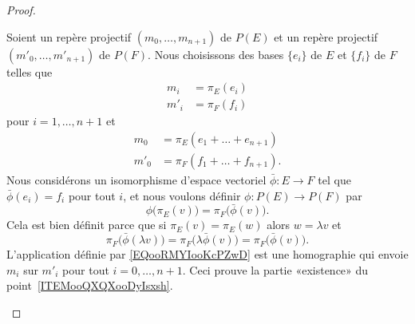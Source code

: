 \begin{proof}
\begin{subproof}
            Soient un repère projectif \( (m_0,\ldots, m_{n+1})\) de \( P(E)\) et un repère projectif \( (m'_0,\ldots, m'_{n+1})\) de \( P(F)\). Nous choisissons des bases \( \{ e_i \}\) de \( E\) et \(  \{ f_i \}\) de \( F\) telles que
            \begin{subequations}
                \begin{align}
                    m_i&=\pi_E(e_i)\\
                    m'_i&=\pi_F(f_i)
                \end{align}
            \end{subequations}
            pour \( i=1,\ldots, n+1\) et
            \begin{subequations}
                \begin{align}
                    m_0&=\pi_E(e_1+\ldots +e_{n+1})\\
                    m'_0&=\pi_F(f_1+\ldots +f_{n+1}).
                \end{align}
            \end{subequations}
            Nous considérons un isomorphisme d'espace vectoriel \( \bar\phi\colon E\to F\) tel que \( \bar\phi(e_i)=f_i\) pour tout \( i\), et nous voulons définir \( \phi\colon P(E)\to P(F)\) par
            \begin{equation}        \label{EQooRMYIooKcPZwD}
                \phi\big( \pi_E(v) \big)=\pi_F\big( \bar\phi(v) \big).
            \end{equation}
            Cela est bien définit parce que si \( \pi_E(v)=\pi_E(w)\) alors \( w=\lambda v\) et
            \begin{equation}
                \pi_F\big( \bar\phi(\lambda v) \big)=\pi_F\big( \lambda\bar\phi(v) \big)=\pi_F\big( \bar\phi(v) \big).
            \end{equation}
            L'application définie par \eqref{EQooRMYIooKcPZwD} est une homographie qui envoie \( m_i\) sur \( m'_i\) pour tout \( i=0,\ldots, n+1\). Ceci prouve la partie «existence» du point~\ref{ITEMooQXQXooDyIsxsh}.


\end{subproof}
\end{proof}
